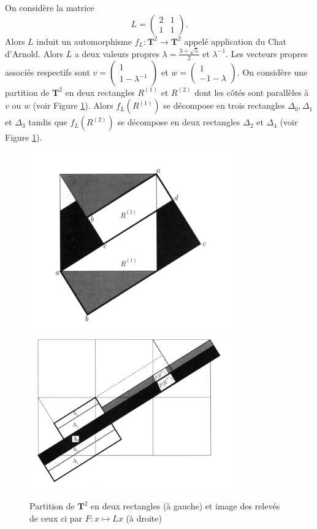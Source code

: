 \documentclass[a4paper,10pt,openany]{article}
\theoremstyle{plain}
\theoremstyle{definition}
\newcommand{\T}{\mathbf{T}}
\begin{document}
\vspace{0.6cm}


 \vspace{1.5mm} 

\noindent On consid\`ere la matrice
$$
L = \begin{pmatrix} 2 & 1 \\ 1 & 1
\end{pmatrix}.
$$
Alors $L$ induit un automorphisme $f_L : \T^2 \to \T^2$ appel\'e application du Chat d'Arnold. Alors $L$ a deux valeurs propres $\displaystyle{\lambda = \frac{3 + \sqrt{5}}{2}}$ et $\lambda^{-1}$. Les vecteurs propres associ\'es respectifs sont $\displaystyle{v = \begin{pmatrix}1 \\ 1 - \lambda^{-1}\end{pmatrix}}$ et $w = \displaystyle{ \begin{pmatrix}1 \\ -1 - \lambda\end{pmatrix}}$. On consid\`ere une partition de $\T^2$ en deux rectangles $R^{(1)}$ et $R^{(2)}$ dont les c\^ot\'es sont parall\`eles \`a $v$ ou $w$ (voir Figure \ref{fig:partition}). Alors $f_L(R^{(1)})$ se d\'ecompose en trois rectangles $\Delta_0, \Delta_1$ et $\Delta_3$ tandis que $f_L(R^{(2)})$ se d\'ecompose en deux rectangles $\Delta_2$ et $\Delta_4$ (voir Figure \ref{fig:partition}).
\begin{figure}[h!]
\includegraphics[width=8.95cm]{partition_torus.png}
\includegraphics[width=8.95cm]{image_partition_torus.png}
\caption{Partition de $\T^2$ en deux rectangles (\`a gauche) et image des relev\'es de ceux ci par $F : x \mapsto Lx$ (\`a droite)}
\label{fig:partition}
\end{figure}
\end{document}
